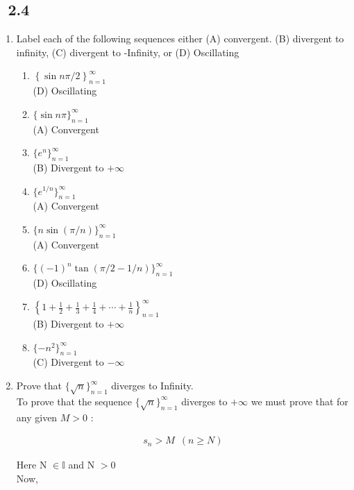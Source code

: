 \documentclass[11pt, letterpaper]{article}
\begin{document}
\subsection{\exr \, 2.4}
\begin{enumerate}
\item{Label each of the following sequences either (A) convergent. (B) divergent to infinity, (C) divergent to -Infinity, or (D) Oscillating
	\begin{enumerate}
		\item{$\left\lbrace \sin{n\pi/2} \right\rbrace_{n=1}^\infty$\\
		(D) Oscillating}
		\item{$\lbrace \sin{n\pi} \rbrace_{n=1}^\infty$\\
		(A) Convergent}
		\item{$\lbrace e^n \rbrace_{n=1}^\infty$ \\
		(B) Divergent to $+ \infty$}
		\item{$\lbrace e^{1/n} \rbrace_{n=1}^\infty$\\
		(A) Convergent}
		\item{$\lbrace n \sin (\pi/n) \rbrace_{n=1}^\infty$\\
		(A) Convergent}
		\item{$\lbrace (-1)^n \tan(\pi/2 - 1/n) \rbrace_{n=1}^\infty$\\
		(D) Oscillating}
		\item{$\left\lbrace 1 + \frac{1}{2} + \frac{1}{3} + \frac{1}{4} + \cdots + \frac{1}{n}\right\rbrace_{n=1} ^ \infty$\\
		(B) Divergent to $+ \infty$}
		\item{$\lbrace -n^2 \rbrace_{n=1}^\infty$\\
		(C) Divergent to $-\infty$}
	\end{enumerate}
} 

\item{Prove that $\lbrace \sqrt{n} \rbrace_{n=1}^\infty$ diverges to Infinity.\\
	To prove that the sequence $ \lbrace \sqrt{n} \rbrace_{n=1}^\infty $ diverges to $+ \infty$ we must prove that for any given $M > 0$ :
	
	\setcounter{equation}{0}
	
	\begin{eqnarray}
		s_n > M \,\,\, (n \geq N)
	\end{eqnarray}
	
	Here N $\in \mathbb{I}$ and N $> 0$\\
	Now,
	
}
\end{enumerate}
\end{document}
